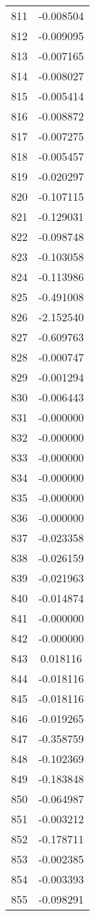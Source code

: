 \documentclass[12pt]{article}
\begin{document}
\begin{longtable}{@{}cc@{}}
811 & -0.008504 \\
812 & -0.009095 \\
813 & -0.007165 \\
814 & -0.008027 \\
815 & -0.005414 \\
816 & -0.008872 \\
817 & -0.007275 \\
818 & -0.005457 \\
819 & -0.020297 \\
820 & -0.107115 \\
821 & -0.129031 \\
822 & -0.098748 \\
823 & -0.103058 \\
824 & -0.113986 \\
825 & -0.491008 \\
826 & -2.152540 \\
827 & -0.609763 \\
828 & -0.000747 \\
829 & -0.001294 \\
830 & -0.006443 \\
831 & -0.000000 \\
832 & -0.000000 \\
833 & -0.000000 \\
834 & -0.000000 \\
835 & -0.000000 \\
836 & -0.000000 \\
837 & -0.023358 \\
838 & -0.026159 \\
839 & -0.021963 \\
840 & -0.014874 \\
841 & -0.000000 \\
842 & -0.000000 \\
843 & 0.018116 \\
844 & -0.018116 \\
845 & -0.018116 \\
846 & -0.019265 \\
847 & -0.358759 \\
848 & -0.102369 \\
849 & -0.183848 \\
850 & -0.064987 \\
851 & -0.003212 \\
852 & -0.178711 \\
853 & -0.002385 \\
854 & -0.003393 \\
855 & -0.098291 \\

\end{longtable}
\end{document}
